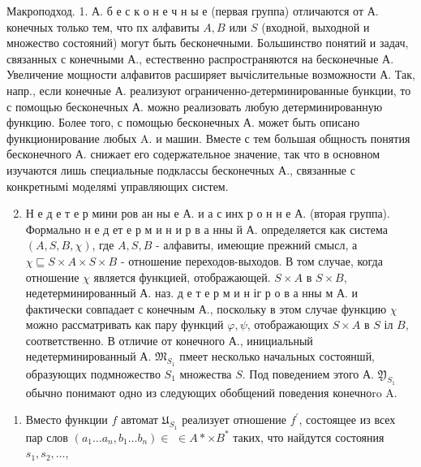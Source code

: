 \documentclass[10pt]{article}
\begin{document}
Макроподход. 1. А. б е с к о н е ч н ы е (первая группа) отличаются от А. конечных только тем, что пх алфавиты $A, B$ или $S$ (входной, выходной и множество состояний) могут быть бесконечными. Большинство понятий и задач, связанных с конечными А., естественно распространяются на бесконечные А. Увеличение мощности алфавитов расширяет вычіслительные возможности А. Так, напр., если конечные А. реализуют ограниченно-детерминированные бункции, то с помощью бесконечных А. можно реализовать любую детерминированную функцию. Более того, с помощью бесконечных А. может быть описано функционирование любых A. и машин. Вместе с тем большая общность понятия бесконечного А. снижает его содержательное значение, так что в основном изучаются лишь специальные подклассы бесконечных А., связанные с конкретнымі моделямі управляющих систем.



\begin{enumerate}

  \setcounter{enumi}{1}

  \item Н е д е т е р мини ров ан ны е А. и а с инх р о н н е А. (вторая группа). Формально н е д ет е р м и н и р в а нны й А. определяется как система $(A, S, B, \chi)$, где $A, S, B$ - алфавиты, имеющие прежний смысл, а $\chi \sqsubseteq S \times A \times S \times B$ - отношение переходов-выходов. В том случае, когда отношение $\chi$ является функцией, отображающей. $S \times A$ в $S \times B$, недетерминированный А. наз. д е т е р м и н іг р о в а нны м А. и фактически совпадает с конечным А., поскольку в этом случае функцию $\chi$ можно рассматривать как пару функций $\varphi, \psi$, отображающих $S \times A$ в $S$ іл $B$, соответственно. В отличие от конечного А., инициальный недетерминированный А. $\mathfrak{M}_{S_{1}}$ пмеет несколько начальных состояншй, образующих подмножество $S_{1}$ множества $S$. Под поведением этого А. $\mathfrak{Y}_{S_{1}}$ обычно понимают одно из следующих обобщений поведения конечноro A.

\end{enumerate}



\begin{enumerate}

  \item Вместо функции $f$ автомат $\mathfrak{U}_{S_{1}}$ реализует отношение $f^{\prime}$, состоящее из всех пар слов $\left(a_{1} \ldots a_{n}, b_{1} \ldots b_{n}\right) \in$ $\in A * \times B^{*}$ таких, что найдутся состояния $s_{1}, s_{2}, \ldots$,

\end{enumerate}
\end{document}
